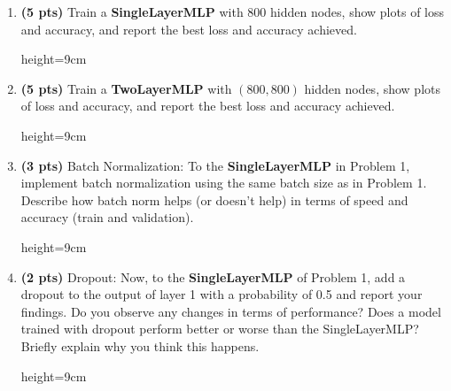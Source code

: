 \begin{enumerate}
    \item \textbf{(5 pts)} Train a \textbf{SingleLayerMLP} with $800$ hidden nodes, show plots of loss and accuracy, and report the best loss and accuracy achieved.
    \begin{soln}{height=9cm}
    \FiveBA
    \end{soln}

    \item \textbf{(5 pts)} Train a \textbf{TwoLayerMLP} with $(800, 800)$ hidden nodes, show plots of loss and accuracy, and report the best loss and accuracy achieved.
    \begin{soln}{height=9cm}
    \FiveBB
    \end{soln}
    \newpage
    
    \item \textbf{(3 pts)} Batch Normalization: To the \textbf{SingleLayerMLP} in Problem 1, implement batch normalization using the same batch size as in Problem 1. Describe how batch norm helps (or doesn't help) in terms of speed and accuracy (train and validation).
    \begin{soln}{height=9cm}
    \FiveBC
    \end{soln}

    \item \textbf{(2 pts)}  Dropout: Now, to the \textbf{SingleLayerMLP} of Problem 1, add a dropout to the output of layer 1 with a probability of 0.5 and report your findings. Do you observe any changes in terms of performance? Does a model trained with dropout perform better or worse than the SingleLayerMLP? Briefly explain why you think this happens.
    \begin{soln}{height=9cm}
    \FiveBD
    \end{soln}

\end{enumerate}